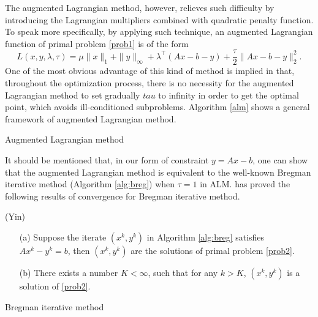 \documentclass{article}
\begin{document}
The augmented Lagrangian method, however, relieves such difficulty by introducing the Lagrangian multipliers combined with quadratic penalty function. To speak more specifically, by applying such technique, an augmented Lagrangian function of primal problem \eqref{prob1} is of the form
\begin{equation}\label{al}
L(x,y,\lambda,\tau) = \mu\|x\|_1+\|y\|_\infty +\lambda^\top(Ax-b-y) +\frac{\tau}{2}\|Ax-b-y\|_2^2.
\end{equation}
One of the most obvious advantage of this kind of method is implied in that, throughout the optimization process, there is no necessity for the augmented Lagrangian method to set gradually $tau$ to infinity in order to get the optimal point, which avoids ill-conditioned subproblems. Algorithm \ref{alm} shows a general framework of augmented Lagrangian method.
\begin{algorithm}[H]
	\caption{Augmented Lagrangian method}
	\begin{algorithmic}[1]\label{alm}
		\ENDWHILE
	\end{algorithmic}
\end{algorithm}
It should be mentioned that, in our form of constraint $y=Ax-b$, one can show that the augmented Lagrangian method is equivalent to the well-known Bregman iterative method (Algorithm \ref{alg:breg}) when $\tau=1$ in ALM. \cite{yin2008bregman} has proved the following results of convergence for Bregman iterative method.
\begin{theorem}
(Yin)
\begin{itemize}
	\item [(a)]Suppose the iterate $(x^k,y^k)$ in Algorithm \ref{alg:breg} satisfies $Ax^k-y^k=b$, then $(x^k,y^k)$ are the solutions of primal problem \eqref{prob2}.
	\item [(b)]There exists a number $K<\infty$, such that for any $k>K$, $(x^k,y^k)$ is a solution of \eqref{prob2}.
\end{itemize}
\end{theorem}
\begin{algorithm}[H]
\caption{Bregman iterative method}
\begin{algorithmic}[1]\label{alg:breg}
\ENDWHILE
{}
\end{algorithmic}
\end{algorithm}
\end{document}
